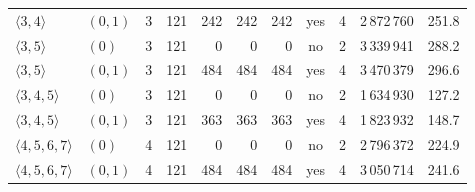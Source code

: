 \begin{tabular}{llrrrrrcrrr}
$ \langle 3,4\rangle  $ & $(0,1)$ & 3 & 121 & 242 & 242 & 242 & yes & 4 & 2\,872\,760 & 251.8 \\
$ \langle 3,5\rangle  $ & $(0)$ & 3 & 121 & 0 & 0 & 0 & no & 2 & 3\,339\,941 & 288.2 \\
$ \langle 3,5\rangle  $ & $(0,1)$ & 3 & 121 & 484 & 484 & 484 & yes & 4 & 3\,470\,379 & 296.6 \\
$ \langle 3,4,5\rangle  $ & $(0)$ & 3 & 121 & 0 & 0 & 0 & no & 2 & 1\,634\,930 & 127.2 \\
$ \langle 3,4,5\rangle  $ & $(0,1)$ & 3 & 121 & 363 & 363 & 363 & yes & 4 & 1\,823\,932 & 148.7 \\
$ \langle 4,5,6,7\rangle  $ & $(0)$ & 4 & 121 & 0 & 0 & 0 & no & 2 & 2\,796\,372 & 224.9 \\
$ \langle 4,5,6,7\rangle  $ & $(0,1)$ & 4 & 121 & 484 & 484 & 484 & yes & 4 & 3\,050\,714 & 241.6 \\
\bottomrule
\end{tabular}
